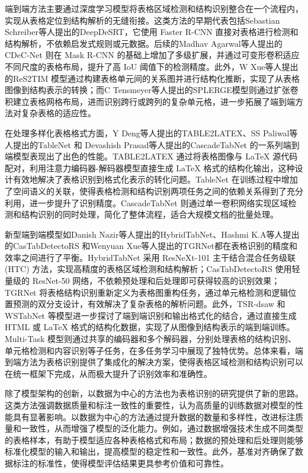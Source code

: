 \documentclass[UTF8,12pt, AutoFakeBold,fontset = founder]{ctexart}
\begin{document}
端到端方法主要通过深度学习模型将表格区域检测和结构识别整合在一个流程内，实现从表格定位到结构解析的无缝衔接。这类方法的早期代表包括Sebastian Schreiber\cite{m12}等人提出的DeepDeSRT，它使用 Faster R-CNN 直接对表格进行检测和结构解析，不依赖启发式规则或元数据。后续的Madhav Agarwal\cite{m13}等人提出的CDeC-Net 则在 Mask R-CNN 的基础上增加了多级扩展，并通过可变形卷积适应不同尺度的表格布局，提升了高 IoU 阈值下的检测精度。此外，W Xue\cite{m14}等人提出的ReS2TIM 模型通过构建表格单元间的关系图并进行结构化推断，实现了从表格图像到结构表示的转换；而C Tensmeyer\cite{m15}等人提出的SPLERGE模型则通过扩张卷积建立表格网格布局，进而识别跨行或跨列的复杂单元格，进一步拓展了端到端方法对复杂表格的适应性。

在处理多样化表格格式方面，Y Deng\cite{m16}等人提出的TABLE2LATEX、SS Paliwal\cite{m17}等人提出的TableNet 和 Devashish Prasad\cite{m18}等人提出的CascadeTabNet 的一系列端到端模型表现出了出色的性能。TABLE2LATEX 通过将表格图像与 LaTeX 源代码配对，利用注意力编码器-解码器模型直接生成 LaTeX 格式的结构化输出，这种设计有效地解决了表格识别到格式化表示的转化问题。TableNet 在训练过程中增加了空间语义的关联，使得表格检测和结构识别两项任务之间的依赖关系得到了充分利用，进一步提升了识别精度。CascadeTabNet 则通过单一卷积网络实现区域检测和结构识别的同时处理，简化了整体流程，适合大规模文档的批量处理。

新型端到端模型如Danish Nazir\cite{m19}等人提出的HybridTabNet、Hashmi K.A\cite{m20}等人提出的CasTabDetectoRS 和Wenyuan Xue\cite{m9}等人提出的TGRNet都在表格识别的精度和效率之间进行了平衡。HybridTabNet 采用 ResNeXt-101 主干结合混合任务级联 (HTC) 方法，实现高精度的表格区域检测和结构解析；CasTabDetectoRS 使用轻量级的 ResNet-50 网络，不依赖预处理和后处理即可获得较高的识别效果；TGRNet 将表格结构识别重新定义为表格图重构任务，通过单元格检测和逻辑位置预测的双分支设计，有效解决了复杂表格的解析问题。此外，TSR-dsaw 和 WSTabNet 等模型进一步探讨了端到端识别和输出格式化的结合，通过直接生成 HTML 或 LaTeX 格式的结构化数据，实现了从图像到结构表示的端到端训练。Multi-Task 模型则通过共享的编码器和多个解码器，分别处理表格的结构识别、单元格检测和内容识别等子任务，在多任务学习中展现了独特优势。总体来看，端到端方法为表格识别提供了集成化的解决方案，使得表格区域检测和结构识别可以在统一框架下完成，从而极大提升了识别效率和准确性。

除了模型架构的创新，以数据为中心的方法也为表格识别的研究提供了新的思路。这类方法强调数据质量和标注一致性的重要性，认为高质量的训练数据对模型的性能具有显著影响。以数据为中心的方法通过提升数据的数量和多样性，改进标注质量和一致性，从而增强了模型的泛化能力。例如，通过数据增强技术生成不同类型的表格样本，有助于模型适应各种表格格式和布局；数据的预处理和后处理则能够标准化模型的输入和输出，提高模型的稳定性和一致性。此外，基准对齐确保了数据标注的标准性，使得模型评估结果更具参考价值和可靠性。
\end{document}
